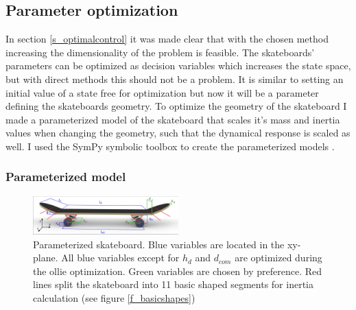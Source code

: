 \subsection{Parameter optimization}\label{s_paropt}
\noindent In section \ref{s_optimalcontrol} it was made clear that with the chosen method increasing the dimensionality of the problem is feasible. The skateboards' parameters can be optimized as decision variables which increases the state space, but with direct methods this should not be a problem. It is similar to setting an initial value of a state free for optimization but now it will be a parameter defining the skateboards geometry. To optimize the geometry of the skateboard I made a parameterized model of the skateboard that scales it's mass and inertia values when changing the geometry, such that the dynamical response is scaled as well. I used the SymPy symbolic toolbox to create the parameterized models \cite{meurer_sympy_2017}. 

\subsubsection{Parameterized model}\label{ss_model}
\begin{figure}
\centerline{\includegraphics[width=0.5\textwidth,trim={0.1cm 0.1cm 0.1cm 0.05cm},clip]{figure/parameterized.png}}
\caption[11-Segment skateboard model]{Parameterized skateboard. Blue variables are located in the xy-plane. All blue variables except for $h_d$ and $d_{com}$ are optimized during the ollie optimization. Green variables are chosen by preference. Red lines split the skateboard into 11 basic shaped segments for inertia calculation (see figure \ref{f_basicshapes})}
\label{f_11segments}
\end{figure}

